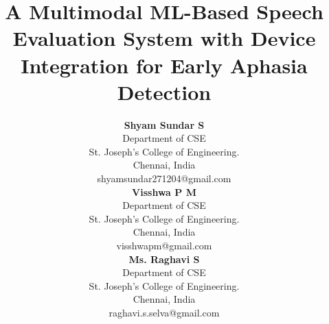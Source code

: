 \documentclass[conference]{IEEEtran}
\begin{document}
\title{A Multimodal ML-Based Speech Evaluation System with Device Integration for Early Aphasia Detection}

\author{
\hspace*{-0.5cm}
\begin{minipage}[t]{0.32\textwidth}
\centering
\textbf{Shyam Sundar S}\\
Department of CSE\\
St. Joseph's College of Engineering.\\
Chennai, India\\
shyamsundar271204@gmail.com
\end{minipage}
\hfill
\begin{minipage}[t]{0.32\textwidth}
\centering
\textbf{Visshwa P M}\\
Department of CSE\\
St. Joseph's College of Engineering.\\
Chennai, India\\
visshwapm@gmail.com
\end{minipage}
\hfill
\begin{minipage}[t]{0.32\textwidth}
\centering
\textbf{Ms. Raghavi S}\\
Department of CSE\\
St. Joseph's College of Engineering.\\
Chennai, India\\
raghavi.s.selva@gmail.com
\end{minipage}
}

\maketitle
\end{document}
